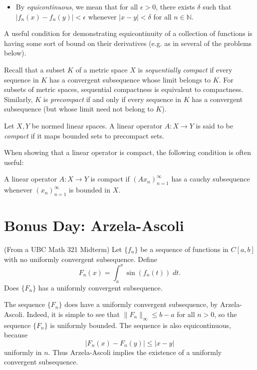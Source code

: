 \documentclass[answers]{exam}
\theoremstyle{problemstyle}
\newcommand{\1}[1]{\textbf{1}_{\left[#1\right]}} %
\begin{document}
\begin{questions}
\begin{itemize}
\item By \textit{equicontinuous}, we mean that for all $\epsilon>0$, there exists $\delta$ such that  $|f_n(x)-f_n(y)|<\epsilon$ whenever $|x-y|<\delta$ for all $n\in \mathbb{N}$.

\end{itemize}

A useful condition for demonstrating equicontinuity of a collection of functions is having some sort of bound on their derivatives (e.g. as in several of the problems below).


Recall that a subset $K$ of a metric space $X$ is \textit{sequentially compact} if every sequence in $K$ has a convergent subsequence whose limit belongs to $K$. For subsets of metric spaces, sequential compactness is equivalent to compactness. Similarly, $K$ is \textit{precompact} if and only if every sequence in $K$ has a convergent subsequence (but whose limit need not belong to $K$).


Let $X,Y$ be normed linear spaces. A linear operator $A:X\to Y$ is said to be \textit{compact} if it maps bounded sets to precompact sets.

When showing that a linear operator is compact, the following condition is often useful: 

A linear operator $A:X\to Y$ is compact if $(Ax_n)_{n=1}^{\infty}$ has a cauchy subsequence whenever $(x_n)_{n=1}^{\infty}$ is bounded in $X$.


\newpage
\section{Bonus Day: Arzela-Ascoli}

\question (From a UBC Math 321 Midterm) Let $\{ f_n \}$ be a sequence of functions in $C[a,b]$ with no uniformly convergent subsequence. Define
%
\[ F_n(x) = \int_a^x \sin(f_n(t))\; dt. \]
%
Does $\{ F_n \}$ has a uniformly convergent subsequence.
\begin{solution}
    The sequence $\{ F_n \}$ does have a uniformly convergent subsequence, by Arzela-Ascoli. Indeed, it is simple to see that $\| F_n \|_\infty \leq b - a$ for all $n > 0$, so the sequence $\{ F_n \}$ is uniformly bounded. The sequence is also equicontinuous, because
    \[ |F_n(x) - F_n(y)| \leq |x - y| \]
    uniformly in $n$. Thus Arzela-Ascoli implies the existence of a uniformly convergent subsequence.
\end{solution}



\end{questions}
\end{document}
